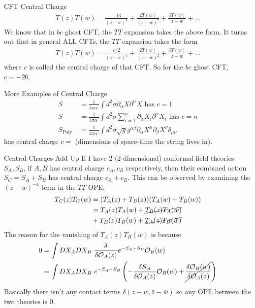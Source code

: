 \documentclass{beamer}
\newcommand{\paren}[1]{\ensuremath{\left(#1\right)}}
\begin{document}
\begin{frame}{CFT Central Charge}
    \begin{align}
        T(z) T(w)=\frac{-13}{(z-w)^4}+\frac{2 T(w)}{(z-w)^2}+\frac{\partial T(w)}{z-w}+\ldots
    \end{align}
    We know that in $bc$ ghost CFT, the $TT$ expansion takes the above form. It turns out that in general ALL CFTs, the $TT$ expansion takes the form
    \begin{align}
        T(z) T(w)=\frac{c/2}{(z-w)^4}+\frac{2 T(w)}{(z-w)^2}+\frac{\partial T(w)}{z-w}+\ldots
    \end{align}
    where $c$ is called the central charge of that CFT. So for the $bc$ ghost CFT, $c=-26$.  
\end{frame}
\begin{frame}{More Examples of Central Charge}
    \begin{align}
        S&=\frac{1}{4 \pi \alpha^{\prime}} \int d^2 \sigma \partial_\alpha X \partial^\alpha X \text{ has } c=1\\
        S&=\frac{1}{4 \pi \alpha^{\prime}} \int d^2 \sigma \sum_{i=1}^{n} \partial_\alpha X_i \partial^\alpha X_i \text{ has } c=n\\
        S_{\text {Poly }}&=\frac{1}{4 \pi \alpha^{\prime}} \int d^2 \sigma \sqrt{g} g^{\alpha \beta} \partial_\alpha X^\mu \partial_\beta X^\nu \delta_{\mu \nu}
    \end{align}
    has central charge $c=$ (dimensions of space-time the string lives in).
\end{frame}
\begin{frame}{Central Charges Add Up}
    If I have 2 (2-dimensional) conformal field theories $S_A, S_B$, if $A, B$ has central charge $c_A, c_B$ respectively, then their combined action $S_C=S_A + S_B$ has central charge $c_A + c_B$. This can be observed by examining the $(z-w)^{-4}$ term in the $TT$ OPE. 
    \begin{align}
        T_C(z) T_C(w) &= (T_A(z) + T_B(z)) (T_A(w) + T_B(w)) \\
        &=T_A(z) T_A(w) + \cancel{T_B(z)T_A(w)} \\ &+ T_B(z) T_B(w) + \cancel{T_A(z)T_B(w)}
    \end{align}
    The reason for the vanishing of $T_A(z) T_B(w)$ is because
    \begin{align}
        0 &= \int DX_A DX_B \ \frac{\delta}{\delta \mathcal{O}_A(z)} e^{-S_A-S_B} \mathcal{O}_B(w) \\
        &= \int DX_A DX_B \ e^{-S_A-S_B} \paren{-\frac{\delta S_A}{\delta \mathcal{O}_A(z)} \mathcal{O}_B(w) + \cancel{\frac{\delta\mathcal{O}_B(w)}{\delta \mathcal{O}_A(z)} } }
    \end{align}
    Basically there isn't any contact terms $\delta(z-w, \bar z -\bar w)$ so any OPE between the two theories is 0.
\end{frame}
\end{document}
